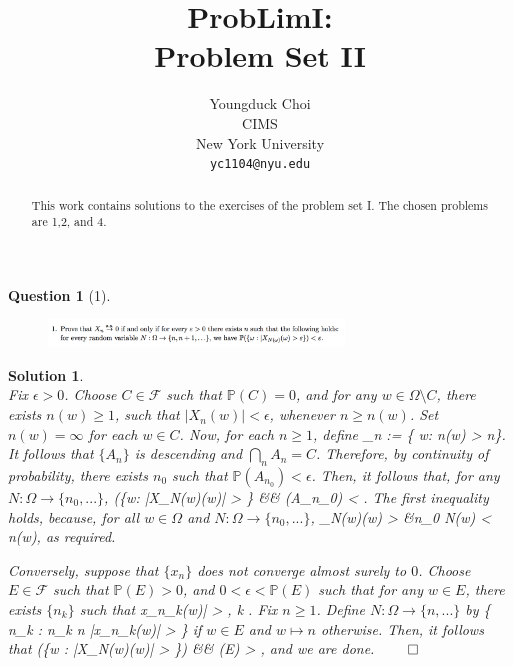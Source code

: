 \documentclass{article} %
\title{ProbLimI: \\
Problem Set II}
\author{
Youngduck Choi \\
CIMS \\
New York University\\
\texttt{yc1104@nyu.edu} \\
}
\def\eQb#1\eQe{\begin{eqnarray*}#1\end{eqnarray*}}
\theoremstyle{quest}
\newtheorem*{question}{Question}
\newtheorem*{solution}{Solution}
\begin{document}
\maketitle

\begin{abstract}
This work contains solutions to the exercises of the problem set I. The
chosen problems are 1,2, and 4.
\end{abstract}

\bigskip

\begin{question}[1]
\hfill
\begin{figure}[h!]
  \centering
    \includegraphics[width=0.7\textwidth]{prob-e3-p1.png}
\end{figure}
\end{question}
\begin{solution} \hfill \\
Fix $\epsilon > 0$.  
Choose $C \in \mathscr{F}$ such that $\mathbb{P}(C) = 0$,
and for any $w \in \Omega \setminus C$, 
there exists $n(w) \geq 1$, such that $|X_n(w)| < \epsilon$, whenever $n \geq n(w)$.
Set $n(w) = \infty$ for each $w \in C$.
Now, for each $n \geq 1$, define
\eQb
A_n := \{ w: n(w) > n\}. 
\eQe 
It follows that $\{ A_n \}$ is descending and $\bigcap_n A_n = C$. Therefore, by
continuity of probability, there exists $n_0$ such that $\mathbb{P}(A_{n_0}) < 
\epsilon$. Then, it follows that, for any $N:\Omega \to \{ n_0,...\}$, 
\eQb
\mathbb{P}(\{w: |X_{N(w)}(w)| > \epsilon\} &\leq& (A_{n_0}) < \epsilon. 
\eQe  
The first inequality holds, because, for all $w \in \Omega$ and $N:\Omega 
\to \{n_0,...\}$,
\eQb
X_{N(w)}(w) > \epsilon &\implies n_0 \leq N(w) < n(w), 
\eQe
as required. 

\bigskip

Conversely, suppose that $\{x_n\}$ does not converge almost surely to $0$. Choose
$E \in \mathscr{F}$ such that $\mathbb{P}(E) > 0$, and $0 < \epsilon < \mathbb{P}(E)$
such that for any $w \in E$, there exists $\{n_k\}$ such that
\eQb
|x_{n_k}(w)| > \epsilon , \>\>  \>\> k .
\eQe  
Fix $n \geq 1$. Define $N: \Omega \to \{n,...\}$ by 
\eQb
w \mapsto \inf\{ n_k \>: \> 
n_k \geq n \>\>  \>\> |x_{n_k}(w)| > \epsilon \} 
\eQe
if $w \in E$ and $w \mapsto n$ otherwise.
Then, it follows that
\eQb
\mathbb{P}(\{w : |X_{N(w)}(w)| > \epsilon\}) &\geq& (E) > \epsilon, 
\eQe
and we are done. \hfill $\qed$


\end{solution}
\end{document}
